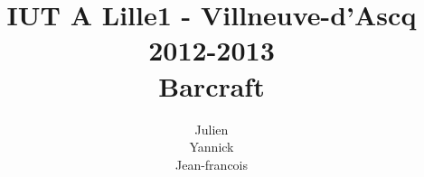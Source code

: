\documentclass[12pt,a4paper]{report}
\title
{
	\normalsize{IUT A Lille1 - Villneuve-d'Ascq\\
	2012-2013}\\
	\vspace{15mm}
  \Huge{Barcraft
    \vspace{15mm}}
}
\author{
\bsc{Stechele} Julien\\
\bsc{Vanuxem} Yannick\\
\bsc{Serir} Jean-francois\\
	\vspace{30mm}
}
\begin{document}

\maketitle

%

\renewcommand{\contentsname}{Sommaire}


%

%

%

%

%

%

\appendix
\end{document}
